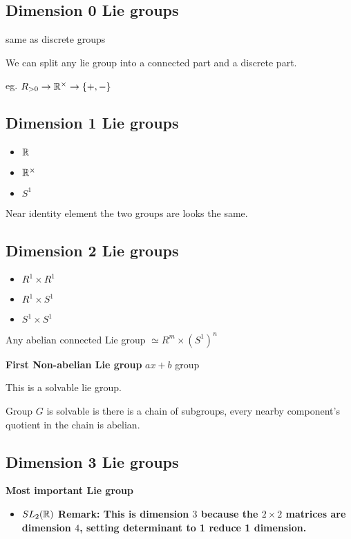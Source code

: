 \documentclass[11pt]{article}
\begin{document}
\subsection{Dimension 0 Lie groups}
\label{sec:org02987a9}
same as discrete groups

We can split any lie group into a connected part and a discrete part.

eg. \(R_{>0} \to \mathbb{R}^{\times} \to \{+,-\}\)
\subsection{Dimension 1 Lie groups}
\label{sec:org2f3bad0}
\begin{itemize}
\item \(\mathbb{R}\)
\item \(\mathbb{R}^{\times}\)
\item \(S^1\)
\end{itemize}

\begin{definition}
Near identity element the two groups are looks the same.
\end{definition}
\subsection{Dimension 2 Lie groups}
\label{sec:org8310860}
\begin{itemize}
\item \(R^1 \times R^1\)
\item \(R^1 \times S^1\)
\item \(S^1 \times S^1\)
\end{itemize}
Any abelian connected Lie group \(\simeq R^m \times (S^1)^n\)

\textbf{First Non-abelian Lie group}
\(ax + b\) group

This is a solvable lie group.

\begin{definition}
Group \(G\) is solvable is there is a chain of subgroups, every nearby component's quotient in the chain is abelian.
\end{definition}
\subsection{Dimension 3 Lie groups}
\label{sec:org4d4383d}
\textbf{Most important Lie group}
\begin{itemize}
\item \(SL_2(\mathbb{R})\)
\textbf{Remark: This is dimension \(3\) because the \(2\times 2\) matrices are dimension \(4\), setting determinant to 1 reduce 1 dimension.}
\end{itemize}
\end{document}
